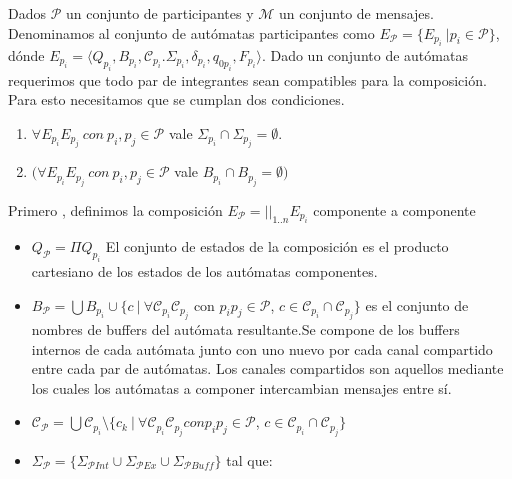 \begin{definition}[Composición]
Dados $\mathcal{P}$ un conjunto de participantes y $\mathcal{M}$ un conjunto de mensajes. Denominamos al conjunto de autómatas participantes como $E_\mathcal{P} = \{E_{p_i} \ | p_i \in \mathcal{P}\}$, dónde $E_{p_i}= \langle Q_{p_i}, B_{p_i}, \mathcal{C}_{p_i}. \Sigma_{p_i}, \delta_{p_i}, q_{0{p_i}}, F_{p_i} \rangle$. Dado un conjunto de autómatas requerimos que todo par de integrantes sean compatibles para la composición. Para esto necesitamos que se cumplan dos condiciones.
\begin{enumerate}
    \item $\forall E_{p_i} E_{p_j} \ \mathit{con} \ p_i,p_j \in \mathcal{P}$ vale $\Sigma_{p_i} \cap \Sigma_{p_j}= \emptyset$. 
    \item $(\forall E_{p_i} E_{p_j} \ \mathit{con} \ p_i,p_j \in \mathcal{P} $ vale $ B_{p_i} \cap B_{p_j}= \emptyset)$
\end{enumerate}
Primero , definimos la composición $E_\mathcal{P}= ||_{1..n} E_{p_i}$ componente a componente
\begin{itemize}
    \item $Q_\mathcal{P}= \Pi Q_{p_i}$ El conjunto de estados de la composición es el producto cartesiano de los estados de los autómatas componentes. 
    
    \item $B_\mathcal{P} = \bigcup B_{p_i} \cup \{ c \ | \ \forall \mathcal{C}_{p_i} \mathcal{C}_{p_j}$ con $p_i p_j \in \mathcal{P}$, $c \in \mathcal{C}_{p_i} \cap \mathcal{C}_{p_j} \}$  es el conjunto de nombres de buffers del autómata resultante.Se compone de los buffers internos de cada autómata junto con uno nuevo por cada canal compartido entre cada par de autómatas. Los canales compartidos son aquellos mediante los cuales los autómatas a componer intercambian mensajes entre sí.
    
    \item $\mathcal{C}_\mathcal{P}= \bigcup \mathcal{C}_{p_i} \setminus \{ c_k \ | \ \forall \mathcal{C}_{p_i} \mathcal{C}_{p_j} \mathit{con} p_i p_j \in \mathcal{P}$, $c \in \mathcal{C}_{p_i} \cap \mathcal{C}_{p_j} \}$
    
    \item $\Sigma_\mathcal{P} = \{\Sigma_{\mathcal{P}\mathit{Int}} \cup \Sigma_{\mathcal{P}\mathit{Ex}} \cup \Sigma_{\mathcal{P}\mathit{Buff}}\}$ tal que: 
    
\end{itemize}
\end{definition}
